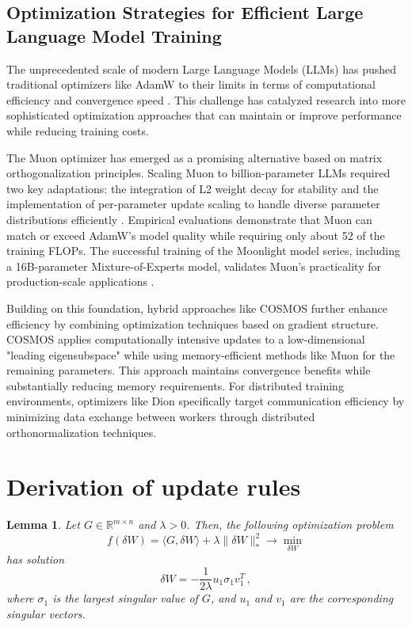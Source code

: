 \documentclass{article} %
\newtheorem{lemma}{Lemma}
\newcommand{\norm}[1]{\lVert #1\rVert}
\begin{document}
\subsection{Optimization Strategies for Efficient Large Language Model Training}
The unprecedented scale of modern Large Language Models (LLMs) has pushed traditional optimizers like AdamW \cite{Loshchilov2017FixingWD} to their limits in terms of computational efficiency and convergence speed \cite{liu2025muon,chen2025cosmoshybridadaptive}. This challenge has catalyzed research into more sophisticated optimization approaches that can maintain or improve performance while reducing training costs.

The Muon optimizer  has emerged as a promising alternative based on matrix orthogonalization principles. Scaling Muon to billion-parameter LLMs required two key adaptations: the integration of L2 weight decay for stability and the implementation of per-parameter update scaling to handle diverse parameter distributions efficiently . Empirical evaluations demonstrate that Muon can match or exceed AdamW's model quality while requiring only about 52 of the training FLOPs. The successful training of the Moonlight model series, including a 16B-parameter Mixture-of-Experts model, validates Muon's practicality for production-scale applications \cite{liu2025muon}.

Building on this foundation, hybrid approaches like COSMOS \cite{chen2025cosmoshybridadaptive} further enhance efficiency by combining optimization techniques based on gradient structure. COSMOS applies computationally intensive updates to a low-dimensional "leading eigensubspace" while using memory-efficient methods like Muon for the remaining parameters. This approach maintains convergence benefits while substantially reducing memory requirements. For distributed training environments, optimizers like Dion \cite{ahn2025dioncommunicationefficientoptimizerlarge} specifically target communication efficiency by minimizing data exchange between workers through distributed orthonormalization techniques.

\section{Derivation of update rules}

\begin{lemma}\label{lem:opt_star}
Let $G \in \mathbb{R}^{m \times n}$ and $\lambda > 0$. Then, the following optimization problem
\begin{equation*} 
  f(\delta W) = \langle G, \delta W \rangle + \lambda \norm{\delta W}_*^2 \to \min_{\delta W}
\end{equation*}
has solution 
\begin{equation*}
  \delta W = -\frac{1}{2\lambda} u_1 \sigma_1 v_1^T\,,
\end{equation*}
where $\sigma_1$ is the largest singular value of $G$, and $u_1$ and $v_1$ are the corresponding singular vectors.
\end{lemma}
\end{document}
